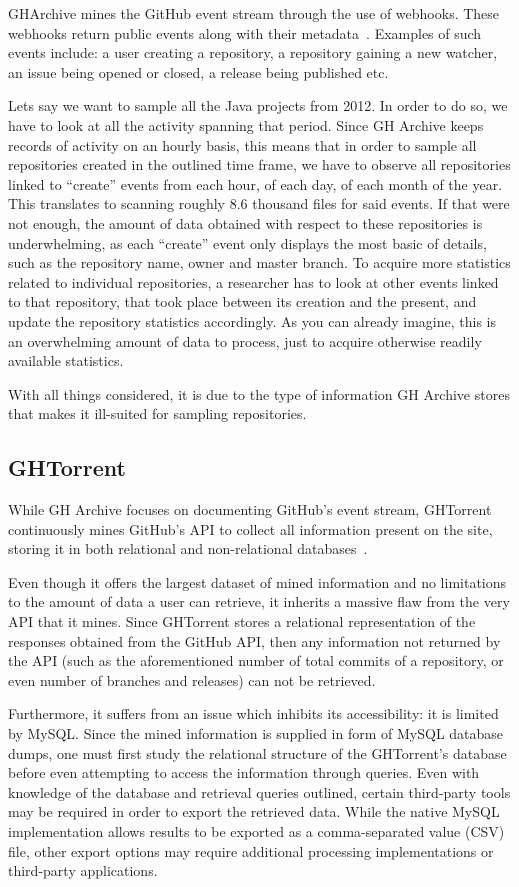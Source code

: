 GHArchive mines the GitHub event stream through the use of webhooks.
These webhooks return public events along with their metadata~\cite{APIWEBHOOKS}.
Examples of such events include: a user creating a repository, a repository gaining a new watcher, an issue being opened or closed, a release being published etc.

Lets say we want to sample all the Java projects from 2012.
In order to do so, we have to look at all the activity spanning that period.
Since GH Archive keeps records of activity on an hourly basis, this means that in order to sample all repositories created in the outlined time frame, we have to observe all repositories linked to ``create'' events from each hour, of each day, of each month of the year.
This translates to scanning roughly 8.6 thousand files for said events.
If that were not enough, the amount of data obtained with respect to these repositories is underwhelming, as each ``create'' event only displays the most basic of details, such as the repository name, owner and master branch.
To acquire more statistics related to individual repositories, a researcher has to look at other events linked to that repository, that took place between its creation and the present, and update the repository statistics accordingly.
As you can already imagine, this is an overwhelming amount of data to process, just to acquire otherwise readily available statistics.

With all things considered, it is due to the type of information GH Archive stores that makes it ill-suited for sampling repositories.

\subsection{GHTorrent}

While GH Archive focuses on documenting GitHub's event stream, GHTorrent continuously mines GitHub's API to collect all information present on the site, storing it in both relational and non-relational databases~\cite{G13}.

Even though it offers the largest dataset of mined information and no limitations to the amount of data a user can retrieve, it inherits a massive flaw from the very API that it mines.
Since GHTorrent stores a relational representation of the responses obtained from the GitHub API, then any information not returned by the API (such as the aforementioned number of total commits of a repository, or even number of branches and releases) can not be retrieved.

Furthermore, it suffers from an issue which inhibits its accessibility: it is limited by MySQL\@.
Since the mined information is supplied in form of MySQL database dumps, one must first study the relational structure of the GHTorrent's database before even attempting to access the information through queries.
Even with knowledge of the database and retrieval queries outlined, certain third-party tools may be required in order to export the retrieved data.
While the native MySQL implementation allows results to be exported as a comma-separated value (CSV) file, other export options may require additional processing implementations or third-party applications.
